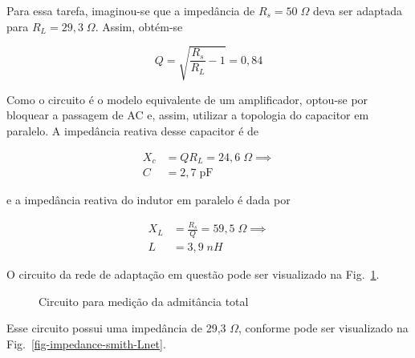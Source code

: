 \documentclass[
  number,
  preprint]{elsarticle}
\begin{document}
Para essa tarefa, imaginou-se que a impedância de \(R_s=50\;\Omega\)
deva ser adaptada para \(R_L=29,3\;\Omega\). Assim, obtém-se

\[
  Q=\sqrt{\frac{R_s}{R_L}-1}=0,84
\]

Como o circuito é o modelo equivalente de um amplificador, optou-se por
bloquear a passagem de AC e, assim, utilizar a topologia do capacitor em
paralelo. A impedância reativa desse capacitor é de

\[
\begin{split}
  X_c&=QR_L=24,6\;\Omega\implies\\
  C&=2,7\;\text{pF}
\end{split}
\]

e a impedância reativa do indutor em paralelo é dada por

\[
\begin{split}
  X_L&=\frac{R_s}{Q}=59,5\;\Omega\implies\\
  L&=3,9\;nH
\end{split}
\]

O circuito da rede de adaptação em questão pode ser visualizado na
Fig.~\ref{fig-L-net}.

\begin{figure}


\caption{\label{fig-L-net}Circuito para medição da admitância total}

\end{figure}%

Esse circuito possui uma impedância de 29,3 \(\Omega\), conforme pode
ser visualizado na Fig.~\ref{fig-impedance-smith-Lnet}.
\end{document}
